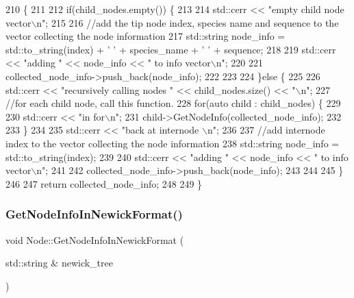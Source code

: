 \begin{DoxyCode}
210                                                                                 \{
211   
212   \textcolor{keywordflow}{if}(child\_nodes.empty()) \{
213     
214     std::cerr << \textcolor{stringliteral}{"empty child node vector\(\backslash\)n"};
215     
216     \textcolor{comment}{//add the tip node index, species name and sequence to the vector collecting the node information}
217     std::string node\_info = std::to\_string(index) + \textcolor{charliteral}{' '} + species\_name + \textcolor{charliteral}{' '} + sequence;
218     
219     std::cerr << \textcolor{stringliteral}{"adding "} << node\_info << \textcolor{stringliteral}{" to info vector\(\backslash\)n"};
220     
221     collected\_node\_info->push\_back(node\_info);
222     
223     
224   \}\textcolor{keywordflow}{else} \{
225     
226     std::cerr << \textcolor{stringliteral}{"recursively calling nodes "} << child\_nodes.size() << \textcolor{stringliteral}{"\(\backslash\)n"};
227     \textcolor{comment}{//for each child node, call this function.}
228     \textcolor{keywordflow}{for}(\textcolor{keyword}{auto} child : child\_nodes) \{
229       
230       std::cerr << \textcolor{stringliteral}{"in for\(\backslash\)n"}; 
231       child->GetNodeInfo(collected\_node\_info);
232       
233     \}
234     
235     std::cerr << \textcolor{stringliteral}{"back at internode \(\backslash\)n"};
236     
237     \textcolor{comment}{//add internode index to the vector collecting the node information}
238     std::string node\_info = std::to\_string(index);
239     
240     std::cerr << \textcolor{stringliteral}{"adding "} << node\_info << \textcolor{stringliteral}{" to info vector\(\backslash\)n"};
241     
242     collected\_node\_info->push\_back(node\_info);
243     
244     
245   \}
246   
247   \textcolor{keywordflow}{return} collected\_node\_info;
248   
249 \}
\end{DoxyCode}
\mbox{\label{classNode_aa7c6c2500e38ecf478b9141188f1c840}} 
\subsubsection{\texorpdfstring{Get\+Node\+Info\+In\+Newick\+Format()}{GetNodeInfoInNewickFormat()}}
{\footnotesize\ttfamily void Node\+::\+Get\+Node\+Info\+In\+Newick\+Format (\begin{DoxyParamCaption}\item[{std\+::string \&}]{newick\+\_\+tree }\end{DoxyParamCaption})}

